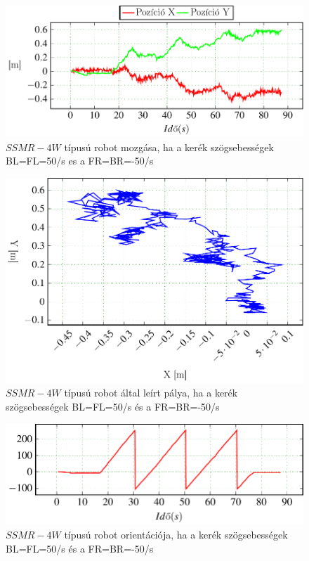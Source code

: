\begin{figure}[H]
  \includegraphics{tikz/Left_n50Right50a.pdf}
  \caption{$SSMR-4W$ típusú robot mozgása, ha a kerék szögsebességek BL=FL=50\degree/s es a FR=BR=-50\degree/s}
  \label{fig:Left_n50Right50a}
\end{figure}


\begin{figure}[H]
  \includegraphics[scale=1]{tikz/Left_n50Right50b.pdf}
  \caption{$SSMR-4W$ típusú robot által leírt pálya, ha a kerék szögsebességek BL=FL=50\degree/s és a FR=BR=-50\degree/s}
    \label{fig:Left_n50Right50b}
\end{figure}



\begin{figure}[H]
  \includegraphics{tikz/Left_n50Right50c.pdf}
  \caption{$SSMR-4W$ típusú robot orientációja,  ha a kerék szögsebességek BL=FL=50\degree/s és a FR=BR=-50\degree/s}
    \label{fig:Left_n50Right50c}
\end{figure}

